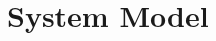 \documentclass[conference]{IEEEtran}
\begin{document}








\section{System Model}

\label{sec:model}


\end{document}
